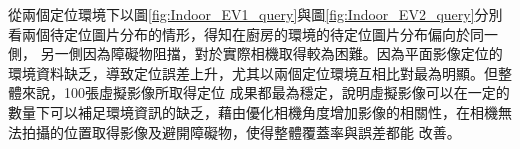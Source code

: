 		從兩個定位環境下以圖\ref{fig:Indoor_EV1_query}與圖\ref{fig:Indoor_EV2_query}分別看兩個待定位圖片分布的情形，得知在廚房的環境的待定位圖片分布偏向於同一側，
	另一側因為障礙物阻擋，對於實際相機取得較為困難。因為平面影像定位的環境資料缺乏，導致定位誤差上升，尤其以兩個定位環境互相比對最為明顯。但整體來說，100張虛擬影像所取得定位
	成果都最為穩定，說明虛擬影像可以在一定的數量下可以補足環境資訊的缺乏，藉由優化相機角度增加影像的相關性，在相機無法拍攝的位置取得影像及避開障礙物，使得整體覆蓋率與誤差都能
	改善。

